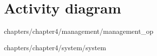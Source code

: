 \section{Activity diagram}





 {chapters/chapter4/management/management_op}

 {chapters/chapter4/system/system}